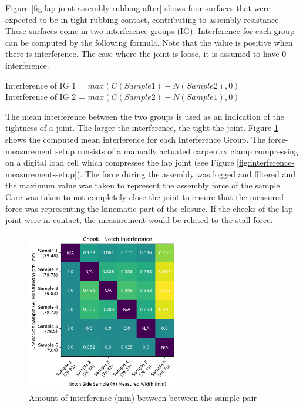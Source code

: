 

Figure \ref{fig:lap-joint-assembly-rubbing-after} shows four surfaces that were expected to be in tight rubbing contact, contributing to assembly resistance. These surfaces come in two interference groups (IG). Interference for each group can be computed by the following formula. Note that the value is positive when there is interference. The case where the joint is loose, it is assumed to have 0 interference. 

Interference of IG 1 = $max( C (Sample 1) - N (Sample 2), 0)$\\
Interference of IG 2 = $max( C (Sample 2) - N (Sample 1), 0)$

The mean interference between the two groups is used as an indication of the tightness of a joint. The larger the interference, the tight the joint. Figure \ref{fig:interference-amount} shows the computed mean interference for each Interference Group. The force-measurement setup consists of a manually actuated carpentry clamp compressing on a digital load cell which compresses the lap joint (see Figure \ref{fig:interference-measurement-setup}). The force during the assembly was logged and filtered and the maximum value was taken to represent the assembly force of the sample. Care was taken to not completely close the joint to ensure that the measured force was representing the kinematic part of the closure. If the cheeks of the lap joint were in contact, the measurement would be related to the stall force.

\begin{figure}
    \centering
    \includegraphics[width=0.6\textwidth]{images/04-1+2/tightness-pairwise-size.png}
    \caption{Amount of interference (mm) between between the sample pair}
    \label{fig:interference-amount}
\end{figure}

